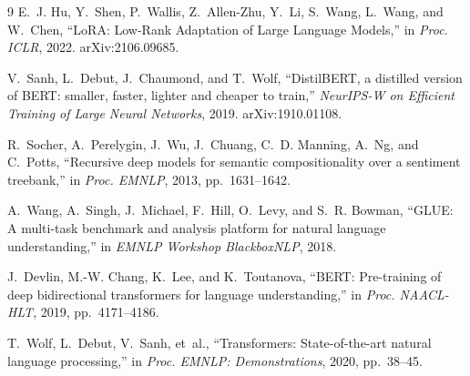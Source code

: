 \documentclass[conference]{IEEEtran}
\begin{document}
\begin{thebibliography}{9}
E.~J. Hu, Y.~Shen, P.~Wallis, Z.~Allen-Zhu, Y.~Li, S.~Wang, L.~Wang, and W.~Chen,
``Lo{RA}: Low-Rank Adaptation of Large Language Models,'' in \emph{Proc. ICLR},
2022. arXiv:2106.09685.

V.~Sanh, L.~Debut, J.~Chaumond, and T.~Wolf, ``DistilBERT, a distilled version
of {BERT}: smaller, faster, lighter and cheaper to train,'' \emph{NeurIPS-W on
Efficient Training of Large Neural Networks}, 2019. arXiv:1910.01108.

R.~Socher, A.~Perelygin, J.~Wu, J.~Chuang, C.~D. Manning, A.~Ng, and
C.~Potts, ``Recursive deep models for semantic compositionality over a
sentiment treebank,'' in \emph{Proc. EMNLP}, 2013, pp.~1631--1642.

A.~Wang, A.~Singh, J.~Michael, F.~Hill, O.~Levy, and S.~R. Bowman, ``{GLUE}: A
multi-task benchmark and analysis platform for natural language
understanding,'' in \emph{EMNLP Workshop BlackboxNLP}, 2018.

J.~Devlin, M.-W. Chang, K.~Lee, and K.~Toutanova, ``{BERT}: Pre-training of
deep bidirectional transformers for language understanding,'' in \emph{Proc.
NAACL-HLT}, 2019, pp.~4171--4186.

T.~Wolf, L.~Debut, V.~Sanh, et~al., ``Transformers: State-of-the-art natural
language processing,'' in \emph{Proc. EMNLP: Demonstrations}, 2020, pp.~38--45.
\end{thebibliography}
\end{document}
